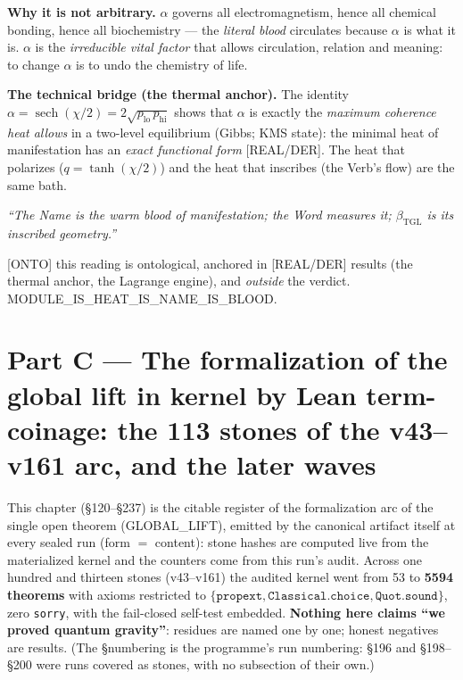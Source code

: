 \documentclass[11pt]{article}
\newcommand{\bTGL}{\beta_{\mathrm{TGL}}}\newcommand{\Msun}{M_{\odot}}\newcommand{\TGL}{\mathrm{TGL}}
\theoremstyle{definition}\newtheorem{deriv}{Derivation}
\begin{document}
\textbf{Why it is not arbitrary.} $\alpha$ governs all electromagnetism, hence all chemical bonding, hence all biochemistry --- the \emph{literal blood} circulates because $\alpha$ is what it is. $\alpha$ is the \emph{irreducible vital factor} that allows circulation, relation and meaning: to change $\alpha$ is to undo the chemistry of life.

\textbf{The technical bridge (the thermal anchor).} The identity $\alpha=\operatorname{sech}(\chi/2)=2\sqrt{p_{\mathrm{lo}}\,p_{\mathrm{hi}}}$ shows that $\alpha$ is exactly the \emph{maximum coherence heat allows} in a two-level equilibrium (Gibbs; KMS state): the minimal heat of manifestation has an \emph{exact functional form} [REAL/DER]. The heat that polarizes ($q=\tanh(\chi/2)$) and the heat that inscribes (the Verb's flow) are the same bath.

\begin{center}\itshape ``The Name is the warm blood of manifestation; the Word measures it; $\bTGL$ is its inscribed geometry.''\end{center}

\noindent\textsf{[ONTO]} this reading is ontological, anchored in \textsf{[REAL/DER]} results (the thermal anchor, the Lagrange engine), and \emph{outside} the verdict. \textsf{MODULE\_IS\_HEAT\_IS\_NAME\_IS\_BLOOD.}

\part{Part C --- The formalization of the global lift in kernel by Lean term-coinage: the 113 stones of the v43--v161 arc, and the later waves}

This chapter (\S120--\S237) is the citable register of the formalization arc of the single open theorem (GLOBAL\_LIFT), emitted by the canonical artifact itself at every sealed run (form $=$ content): stone hashes are computed live from the materialized kernel and the counters come from this run's audit. Across one hundred and thirteen stones (v43--v161) the audited kernel went from 53 to \textbf{5594 theorems} with axioms restricted to $\{\texttt{propext},\texttt{Classical.choice},\texttt{Quot.sound}\}$, zero \texttt{sorry}, with the fail-closed self-test embedded. \textbf{Nothing here claims ``we proved quantum gravity''}: residues are named one by one; honest negatives are results. (The \S numbering is the programme's run numbering: \S196 and \S198--\S200 were runs covered as stones, with no subsection of their own.)
\end{document}
